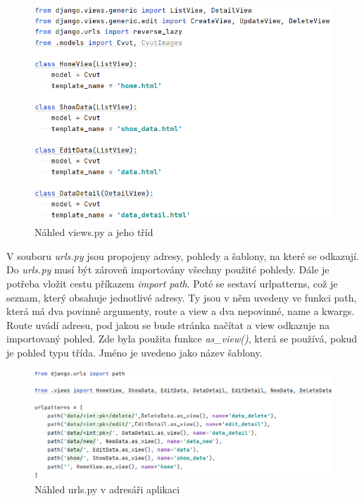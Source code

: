 \begin{figure}[H] \centering
    \includegraphics[width=350pt]{./pictures/6-nahled-views-aplikace.PNG}
    \caption[Náhled views.py a jeho tříd]{Náhled views.py a jeho tříd}
	\label{fig:Náhled views.py a jeho tříd}              
\end{figure}


V souboru \emph{urls.py} jsou propojeny  adresy, pohledy a 
šablony, na které se odkazují. Do \emph{urls.py} musí být zároveň importovány
všechny použité pohledy. Dále je potřeba vložit cestu příkazem \emph{import path}. 
Poté se sestaví urlpatterns, což je seznam, který obsahuje jednotlivé
adresy. Ty jsou v něm uvedeny ve funkci path, která má dva povinné
argumenty, route a view a dva nepovinné, name a kwargs. Route uvádí
adresu, pod jakou se bude stránka načítat a view odkazuje na
importovaný pohled. Zde byla použita funkce \emph{as\_view()}, která
se používá, pokud je pohled typu třída. Jméno je uvedeno jako název
 šablony.

\begin{figure}[H] \centering
    \includegraphics[width=450pt]{./pictures/7-urls-aplikace.PNG}
    \caption[Náhled urls.py v adresáři aplikaci]{Náhled urls.py v adresáři aplikaci}
	\label{fig:Náhled urls.py v adresáři aplikaci}              
\end{figure}

